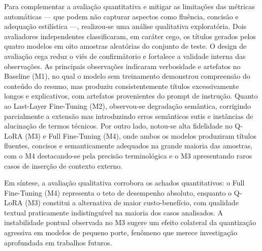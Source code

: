 Para complementar a avaliação quantitativa e mitigar as limitações das métricas automáticas — que podem não capturar aspectos como fluência, concisão e adequação estilística —, realizou-se uma análise qualitativa exploratória. Dois avaliadores independentes classificaram, em caráter cego, os títulos gerados pelos quatro modelos em oito amostras aleatórias do conjunto de teste. O design de avaliação cega reduz o viés de confirmátorio e fortalece a validade interna das observações. As principais observações indicaram verbosidade e artefatos no Baseline (M1), no qual o modelo sem treinamento demonstrou compreensão do conteúdo do resumo, mas produziu consistentemente títulos excessivamente longos e explicativos, com artefatos provenientes do prompt de instrução. Quanto ao Last-Layer Fine-Tuning (M2), observou-se degradação semântica, corrigindo parcialmente a extensão mas introduzindo erros semânticos sutis e instâncias de alucinação de termos técnicos. Por outro lado, notou-se alta fidelidade no Q-LoRA (M3) e Full Fine-Tuning (M4), onde ambos os modelos produziram títulos fluentes, concisos e semanticamente adequados na grande maioria das amostras, com o M4 destacando-se pela precisão terminológica e o M3 apresentando raros casos de inserção de contexto externo.

Em síntese, a avaliação qualitativa corrobora os achados quantitativos: o Full Fine-Tuning (M4) representa o teto de desempenho absoluto, enquanto o Q-LoRA (M3) constitui a alternativa de maior custo-benefício, com qualidade textual praticamente indistinguível na maioria dos casos analisados. A instabilidade pontual observada no M3 sugere um efeito colateral da quantização agressiva em modelos de pequeno porte, fenômeno que merece investigação aprofundada em trabalhos futuros.





